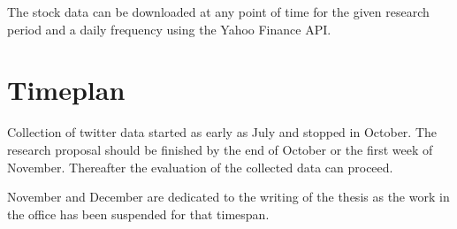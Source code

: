 The stock data can be downloaded at any point of time for the given research period and a daily frequency using the Yahoo Finance API.


\section{Timeplan}

Collection of twitter data started as early as July and stopped in October.
The research proposal should be finished by the end of October or the first week of November.
Thereafter the evaluation of the collected data can proceed.

November and December are dedicated to the writing of the thesis as the work in the office has been suspended for that timespan.

